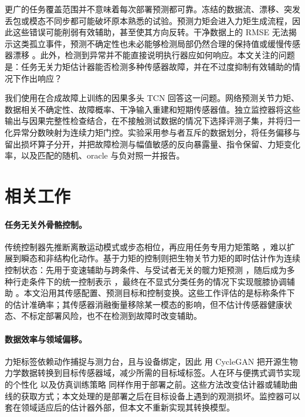 \documentclass[UTF8]{ctexart}
\begin{document}
更广的任务覆盖范围并不意味着每次部署预测都可靠。冻结的数据流、漂移、突发丢包或模态不同步都可能破坏原本熟悉的试验。预测力矩会进入力矩生成流程，因此这些错误可能削弱有效辅助，甚至使其方向反转。干净数据上的 RMSE 无法揭示这类孤立事件，预测不确定性也未必能够检测局部仍然合理的保持值或缓慢传感器漂移 \citep{ovadia2019trust}。此外，检测到异常并不能直接说明执行器应如何响应。本文关注的问题是：任务无关力矩估计器能否检测多种传感器故障，并在不过度抑制有效辅助的情况下作出响应？

我们使用在合成故障上训练的因果多头 TCN 回答这一问题。网络预测关节力矩、数据相关不确定性、故障概率、干净输入重建和短期传感器值。独立监控器将这些输出与因果完整性检查结合，在不接触测试数据的情况下选择评测子集，并将归一化异常分数映射为连续力矩门控。实验采用参与者互斥的数据划分，将任务偏移与留出损坏算子分开，并把故障检测与幅值敏感的反向暴露量、指令保留、力矩变化率，以及匹配的随机、oracle 与负对照一并报告。

\section{相关工作}

\paragraph{任务无关外骨骼控制。}
传统控制器先推断离散运动模式或步态相位，再应用任务专用力矩策略 \citep{camargo2021classification,kang2022classification}，难以扩展到瞬态和非结构化动作。基于力矩的控制则把生物关节力矩的即时估计作为连续控制状态：先用于变速辅助与跨条件、与受试者无关的髋力矩预测 \citep{shepherd2022deep,molinaro2022hip}，随后成为多种行走条件下的统一控制表示 \citep{molinaro2024unifies}，最终在不显式分类任务的情况下实现髋膝协调辅助 \citep{molinaro2024task}。本文沿用其传感配置、预测目标和控制变换。这些工作评估的是标称条件下的估计准确率；其传感器消融衡量移除某一模态的影响，但不估计传感器健康状态、不标定部署风险，也不在检测到故障时改变辅助。

\paragraph{数据效率与领域偏移。}
力矩标签依赖动作捕捉与测力台，且与设备绑定，因此 \citet{scherpereel2025domain} 用 CycleGAN 把开源生物力学数据转换到目标传感器域，减少所需的目标域标签。人在环与便携式调节实现的个性化 \citep{zhang2017humanloop,slade2022personalizing} 以及仿真训练策略 \citep{luo2024simulation} 同样作用于部署之前。这些方法改变估计器或辅助曲线的获取方式；本文处理的是部署之后在目标设备上遇到的观测损坏。监控器可以套在领域适应后的估计器外部，但本文不重新实现其转换模型。
\end{document}
